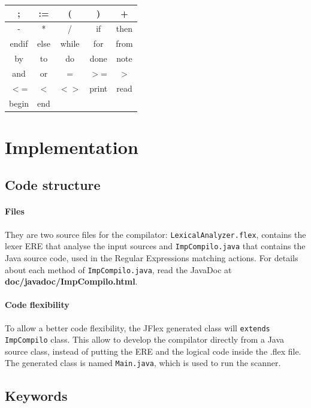 \documentclass[letterpaper]{article}
\begin{document}
\begin{tabular}{|c|c|c|c|c|}
    \hline
    ; & := & ( & )  & + \\
    \hline
    - & *  & / & if & then \\
    \hline
    endif & else & while & for & from \\
    \hline
    by & to & do & done & note \\
    \hline
    and & or & = & $>$= & $>$ \\
    \hline
    $<$= & $<$ & $<>$ & print & read \\
    \hline
    begin & end & & &  \\
    \hline
\end{tabular}


\section{Implementation}

\subsection{Code structure}

\paragraph{Files}

They are two source files for the compilator: \texttt{LexicalAnalyzer.flex},
contains the lexer ERE
that analyse the input sources and \texttt{ImpCompilo.java}
that contains the Java source code, used in the Regular Expressions
matching actions. For details about each method of \texttt{ImpCompilo.java},
read the JavaDoc at \textbf{doc/javadoc/ImpCompilo.html}.


\paragraph{Code flexibility}

To allow a better code flexibility, the JFlex generated class will
\texttt{extends} \texttt{ImpCompilo} class. This allow to develop the
compilator directly from a Java source class, instead of putting the
ERE and the logical code inside the .flex file. The generated class is named
\texttt{Main.java}, which is used to run the scanner.

\subsection{Keywords}
\end{document}
